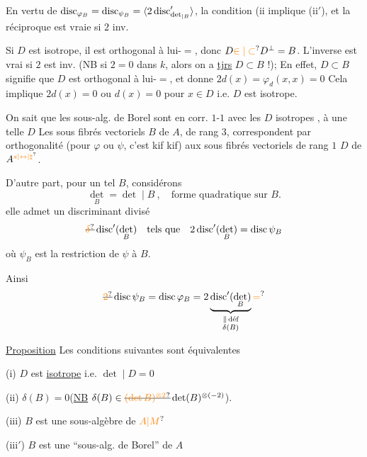 En vertu de $\operatorname{disc}_{\varphi_B}=\operatorname{disc}_{\psi_B}=\inserted{2\operatorname{disc}'_{\det_{\mid B}}}$,  la condition (ii\unsure{)} implique (ii$'$), et la réciproque est vraie si $2$ inv.

 Si $D$ est isotrope, il est orthogonal à lui-$=$, donc $D\unsure{\in|\subset}D^\perp=B$. L'inverse est vrai si $2$ est inv. (NB si $2=0$ dans $k$, alors on a \uline{tjrs} $D\subset B$ !); En effet, $D\subset B$ signifie que $D$ est orthogonal à lui-$=$, et donne $2d(x)=\varphi_d(x,x)=0$ Cela implique $2d(x)=0$ ou $d(x)=0$ pour $x\in D$ i.e. $D$ est isotrope.

On sait que les sous-alg. de Borel sont en corr. $1$-$1$ avec les $D$ isotropes , à  une telle $D$
Les sous fibrés vectoriels $B$ de $A$,  de rang $3$, correspondent par orthogonalité (pour $\varphi$ ou $\psi$, c'est kif kif) aux sous fibrés vectoriels de rang $1$ $D$ de $A^{\unsure{s|\leftrightarrow|\natural}}$.

D'autre part, pour un tel $B$, considérons
\[
\det_B=\det\mid B\ ,\quad\text{forme quadratique sur } B.
\]
elle admet un discriminant divisé
\[
\deleted{\unsure{\delta}}\operatorname{disc}'(\det_B)\quad\text{tels que}\quad2\operatorname{disc}'(\det_B)=\operatorname{disc}\psi_B
\]
où $\psi_B$ est la restriction de $\psi$ à $B$.

Ainsi
\[
\deleted{\unsure{2}}\operatorname{disc}\psi_B=\operatorname{disc}\varphi_B
=2\underbrace{\operatorname{disc}'(\det_B)}_{\substack{\parallel\,\text{déf}\\\delta(B)}}\unsure{=}
\]

\uline{Proposition} Les  conditions suivantes sont équivalentes

(i) $D$ est \uline{isotrope} i.e. $\det\mid D=0$

(ii) $\delta(B)=0$\qquad (\uline{NB} $\delta(B)\in\deleted{\unsure{(\det B)^{\otimes2}}}\det(B)^{\otimes(-2)}$).

 (iii) $B$ est une sous-algèbre de $\unsure{A|M}$


(iii$'$)  $B$ est une ``sous-alg. de Borel'' de $A$

